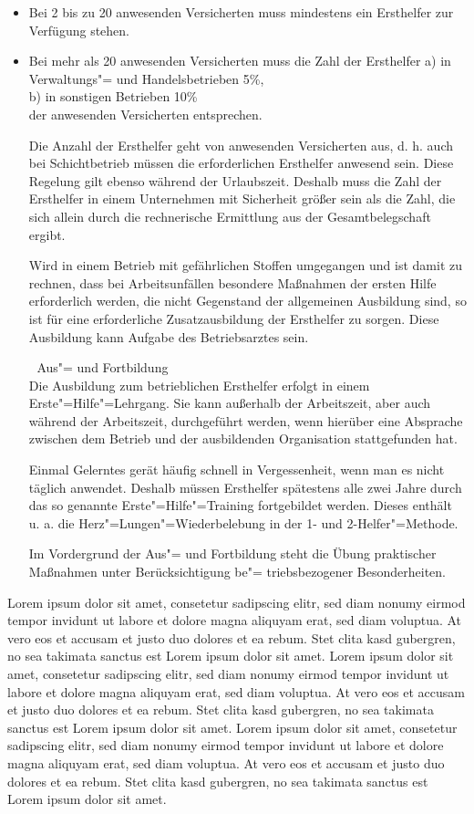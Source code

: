 \documentclass[a4paper]{infoblatt}
\begin{document}
 
\begin{itemize}
\item Bei 2 bis zu 20 anwesenden Versicherten muss mindestens ein Ersthelfer zur Verfügung stehen.
\item Bei mehr als 20 anwesenden Versicherten muss die Zahl der Ersthelfer a) in Verwaltungs"= und Handelsbetrieben 5\%,\\
 b) in sonstigen Betrieben 10\%\\
 der anwesenden Versicherten entsprechen.

 Die Anzahl der Ersthelfer geht von anwesenden Versicherten aus, d. h. auch bei Schichtbetrieb müssen die erforderlichen Ersthelfer anwesend sein. Diese Regelung gilt ebenso während der Urlaubszeit. Deshalb muss die Zahl der Ersthelfer in einem Unternehmen mit Sicherheit größer sein als die Zahl, die sich allein durch die rechnerische Ermittlung aus der Gesamtbelegschaft ergibt.

 Wird in einem Betrieb mit gefährlichen Stoffen umgegangen und ist damit zu rechnen, dass bei Arbeitsunfällen besondere Maßnahmen der ersten Hilfe erforderlich werden, die nicht Gegenstand der allgemeinen Ausbildung sind, so ist für eine erforderliche Zusatzausbildung der Ersthelfer zu sorgen. Diese Ausbildung kann Aufgabe des Betriebsarztes sein.

  Aus"= und Fortbildung\\
 Die Ausbildung zum betrieblichen Ersthelfer erfolgt in einem Erste"=Hilfe"=Lehrgang. Sie kann außerhalb der Arbeitszeit, aber auch während der Arbeitszeit, durchgeführt werden, wenn hierüber eine Absprache zwischen dem Betrieb und der ausbildenden Organisation stattgefunden hat.

 Einmal Gelerntes gerät häufig schnell in Vergessenheit, wenn man es nicht täglich anwendet. Deshalb müssen Ersthelfer spätestens alle zwei Jahre durch das so genannte Erste"=Hilfe"=Training fortgebildet werden. Dieses enthält u. a. die Herz"=Lungen"=Wiederbelebung in der 1- und 2-Helfer"=Methode.

 Im Vordergrund der Aus"= und Fortbildung steht die Übung praktischer Maßnahmen unter Berücksichtigung be"= triebsbezogener Besonderheiten.
\end{itemize}
 Lorem ipsum dolor sit amet, consetetur sadipscing elitr, sed diam nonumy eirmod tempor invidunt ut labore et dolore magna aliquyam erat, sed diam voluptua. At vero eos et accusam et justo duo dolores et ea rebum. Stet clita kasd gubergren, no sea takimata sanctus est Lorem ipsum dolor sit amet. Lorem ipsum dolor sit amet, consetetur sadipscing elitr, sed diam nonumy eirmod tempor invidunt ut labore et dolore magna aliquyam erat, sed diam voluptua. At vero eos et accusam et justo duo dolores et ea rebum. Stet clita kasd gubergren, no sea takimata sanctus est Lorem ipsum dolor sit amet. Lorem ipsum dolor sit amet, consetetur sadipscing elitr, sed diam nonumy eirmod tempor invidunt ut labore et dolore magna aliquyam erat, sed diam voluptua. At vero eos et accusam et justo duo dolores et ea rebum. Stet clita kasd gubergren, no sea takimata sanctus est Lorem ipsum dolor sit amet.   
\end{document}
